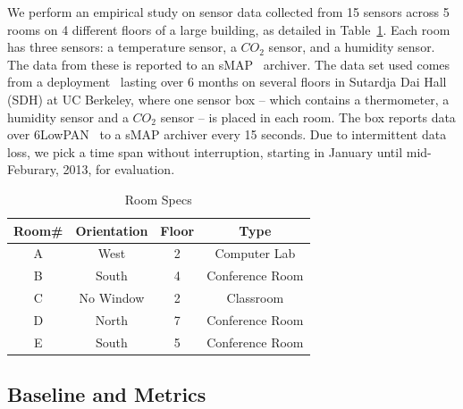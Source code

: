 We perform an empirical study on sensor data collected from 15 sensors across 5 rooms on 4 different floors of a large building, as detailed in Table~\ref{table:roomspec}. 
Each room has three sensors: a temperature sensor, a $CO_{2}$ sensor,  and a humidity sensor. 
The data from these is reported to an sMAP~\cite{smap} archiver. The data set used comes from a deployment~\cite{Jay} lasting 
over 6 months on several floors in Sutardja Dai Hall (SDH) at UC Berkeley, where one sensor box -- which contains a thermometer, a humidity sensor and a $CO_{2}$ sensor -- is placed in each room. The box reports data over 6LowPAN~\cite{6lowpan} to a sMAP archiver every 15 seconds. 
 Due to intermittent data loss, we pick a time span without interruption, starting in January until mid-Feburary, 2013, for evaluation.

\begin{table}[ht!]
\caption{Room Specs}
\centering %
\begin{tabular}{c c c c}%
\hline %
Room\# & Orientation & Floor & Type \\ %
\hline\hline %
A & West & 2 & Computer Lab \\ %
B & South & 4 & Conference Room \\
C & No Window & 2 & Classroom \\
D & North & 7 & Conference Room \\
E & South & 5 & Conference Room \\ %
\hline %
\end{tabular}
\label{table:roomspec} %
\end{table}

\subsection{Baseline and Metrics}

